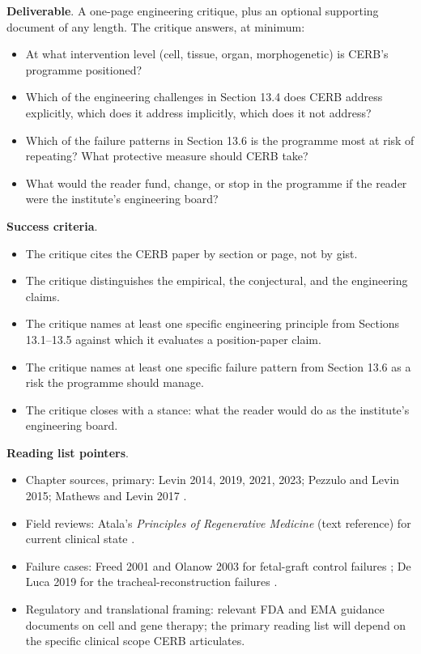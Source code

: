 \begin{project}
\textbf{Deliverable}. A one-page engineering critique, plus an
optional supporting document of any length. The critique answers, at
minimum:

\begin{itemize}
\item At what intervention level (cell, tissue, organ, morphogenetic)
is CERB's programme positioned?
\item Which of the engineering challenges in Section 13.4 does CERB
address explicitly, which does it address implicitly, which does it
not address?
\item Which of the failure patterns in Section 13.6 is the programme
most at risk of repeating? What protective measure should CERB take?
\item What would the reader fund, change, or stop in the programme if
the reader were the institute's engineering board?
\end{itemize}

\textbf{Success criteria}.

\begin{itemize}
\item The critique cites the CERB paper by section or page, not by
gist.
\item The critique distinguishes the empirical, the conjectural, and
the engineering claims.
\item The critique names at least one specific engineering principle
from Sections 13.1--13.5 against which it evaluates a position-paper
claim.
\item The critique names at least one specific failure pattern from
Section 13.6 as a risk the programme should manage.
\item The critique closes with a stance: what the reader would do as
the institute's engineering board.
\end{itemize}

\textbf{Reading list pointers}.

\begin{itemize}
\item Chapter sources, primary: Levin 2014, 2019, 2021, 2023; Pezzulo
and Levin 2015; Mathews and Levin 2017
\cite{paper:v6c13-levin-bioelectric-2014,
paper:v6c13-levin-comp-boundary-2019,
paper:v6c13-levin-life-death-2021,
paper:v6c13-levin-darwin-agential-2023,
paper:v6c13-pezzulo-levin-2015,
paper:v6c13-mathews-levin-2017}.
\item Field reviews: Atala's \textit{Principles of Regenerative
Medicine} (text reference) for current clinical state
\cite{text:v6c13-atala-principles-regen}.
\item Failure cases: Freed 2001 and Olanow 2003 for fetal-graft
control failures \cite{paper:v6c13-freed-fetal-parkinson-2001,
paper:v6c13-olanow-fetal-parkinson-2003}; De Luca 2019 for the
tracheal-reconstruction failures
\cite{paper:v6c13-deluca-tissue-failure}.
\item Regulatory and translational framing: relevant FDA and EMA
guidance documents on cell and gene therapy; the primary reading list
will depend on the specific clinical scope CERB articulates.
\end{itemize}


\end{project}
